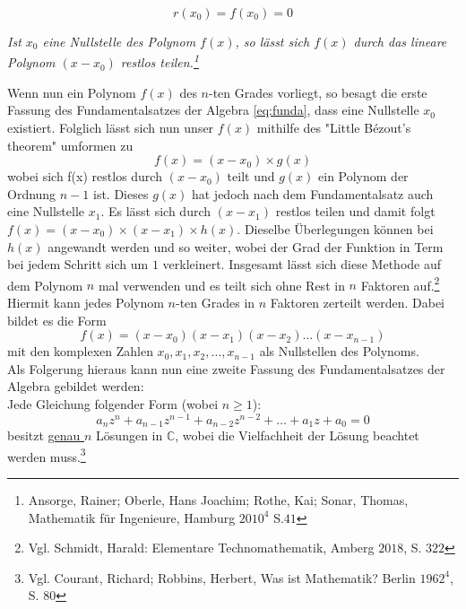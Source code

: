 \documentclass[a4paper,12pt]{article} %
\begin{document}
\begin{equation}\label{eq:bezout0}
r(x_0) = f(x_0)=0
\end{equation}


\noindent \emph{Ist $x_0$ eine Nullstelle des Polynom $f(x)$, so lässt sich $f(x)$ durch das lineare Polynom $(x-x_0)$ restlos teilen.\footnote{Ansorge, Rainer; Oberle, Hans Joachim; Rothe, Kai; Sonar, Thomas, Mathematik für Ingenieure, Hamburg $2010^4$ S.$41$}}



Wenn nun ein Polynom $f(x)$ des $n$-ten Grades vorliegt, so besagt die erste Fassung des Fundamentalsatzes der Algebra \eqref{eq:funda}, dass eine Nullstelle $x_0$ existiert. Folglich lässt sich nun unser $f(x)$ mithilfe des "Little Bézout's theorem" {}umformen zu
\[f(x)=(x-x_0) \times g(x)\]
wobei sich f(x) restlos durch $(x-x_0)$ teilt und $g(x)$ ein Polynom der Ordnung $n-1$ ist.
Dieses $g(x)$ hat jedoch nach dem Fundamentalsatz auch eine Nullstelle $x_1$.
Es lässt sich durch $(x-x_1)$ restlos teilen und damit folgt $f(x) = (x-x_0) \times (x-x_1) \times h(x)$.
Dieselbe Überlegungen können bei $h(x)$ angewandt werden und so weiter, wobei der Grad der Funktion in Term bei jedem Schritt sich um $1$ verkleinert.
Insgesamt lässt sich diese Methode auf dem Polynom $n$ mal verwenden und es teilt sich ohne Rest in $n$ Faktoren auf.\footnote{Vgl. Schmidt, Harald: Elementare Technomathematik, Amberg $2018$, S. $322$}\\

Hiermit kann jedes Polynom $n$-ten Grades in $n$ Faktoren zerteilt werden.
Dabei bildet es die Form
\begin{equation}\label{eq.faktor}
	\boxed{f(x)=(x-x_0)(x-x_1)(x-x_2)\dots(x-x_{n-1})}
\end{equation}
mit den komplexen Zahlen $x_0, x_1, x_2,\dots,x_{n-1}$ als Nullstellen des Polynoms.\\




Als Folgerung hieraus kann nun eine zweite Fassung des Fundamentalsatzes der Algebra gebildet werden:\\

\noindent Jede Gleichung folgender Form (wobei $n \geq 1$):
\begin{equation}\label{eq:funda2}
		a_nz^n + a_{n-1}z^{n-1} + a_{n-2}z^{n-2} + \dots + a_1z + a_0 = 0	
\end{equation}
besitzt \underline{genau $n$} Lösungen in $\mathbb{C}$, wobei die Vielfachheit der Lösung beachtet werden muss.\footnote{Vgl. Courant, Richard; Robbins, Herbert, Was ist Mathematik? Berlin $1962^4$, S. $80$}\\
\end{document}
